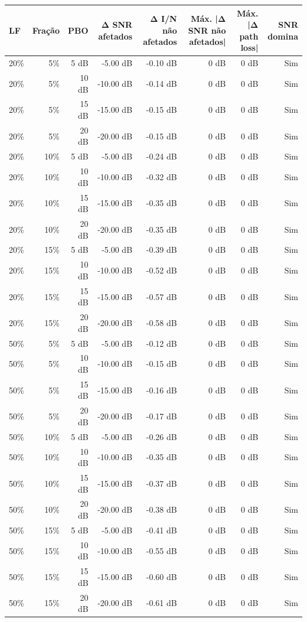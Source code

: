 \begin{tabular}{lrrrrrrr}
\toprule
LF & Fração & PBO & Δ SNR afetados & Δ I/N não afetados & Máx. |Δ SNR não afetados| & Máx. |Δ path loss| & SNR domina \\
\midrule
20\% & 5\% & 5 dB & -5.00 dB & -0.10 dB & 0 dB & 0 dB & Sim \\
20\% & 5\% & 10 dB & -10.00 dB & -0.14 dB & 0 dB & 0 dB & Sim \\
20\% & 5\% & 15 dB & -15.00 dB & -0.15 dB & 0 dB & 0 dB & Sim \\
20\% & 5\% & 20 dB & -20.00 dB & -0.15 dB & 0 dB & 0 dB & Sim \\
20\% & 10\% & 5 dB & -5.00 dB & -0.24 dB & 0 dB & 0 dB & Sim \\
20\% & 10\% & 10 dB & -10.00 dB & -0.32 dB & 0 dB & 0 dB & Sim \\
20\% & 10\% & 15 dB & -15.00 dB & -0.35 dB & 0 dB & 0 dB & Sim \\
20\% & 10\% & 20 dB & -20.00 dB & -0.35 dB & 0 dB & 0 dB & Sim \\
20\% & 15\% & 5 dB & -5.00 dB & -0.39 dB & 0 dB & 0 dB & Sim \\
20\% & 15\% & 10 dB & -10.00 dB & -0.52 dB & 0 dB & 0 dB & Sim \\
20\% & 15\% & 15 dB & -15.00 dB & -0.57 dB & 0 dB & 0 dB & Sim \\
20\% & 15\% & 20 dB & -20.00 dB & -0.58 dB & 0 dB & 0 dB & Sim \\
50\% & 5\% & 5 dB & -5.00 dB & -0.12 dB & 0 dB & 0 dB & Sim \\
50\% & 5\% & 10 dB & -10.00 dB & -0.15 dB & 0 dB & 0 dB & Sim \\
50\% & 5\% & 15 dB & -15.00 dB & -0.16 dB & 0 dB & 0 dB & Sim \\
50\% & 5\% & 20 dB & -20.00 dB & -0.17 dB & 0 dB & 0 dB & Sim \\
50\% & 10\% & 5 dB & -5.00 dB & -0.26 dB & 0 dB & 0 dB & Sim \\
50\% & 10\% & 10 dB & -10.00 dB & -0.35 dB & 0 dB & 0 dB & Sim \\
50\% & 10\% & 15 dB & -15.00 dB & -0.37 dB & 0 dB & 0 dB & Sim \\
50\% & 10\% & 20 dB & -20.00 dB & -0.38 dB & 0 dB & 0 dB & Sim \\
50\% & 15\% & 5 dB & -5.00 dB & -0.41 dB & 0 dB & 0 dB & Sim \\
50\% & 15\% & 10 dB & -10.00 dB & -0.55 dB & 0 dB & 0 dB & Sim \\
50\% & 15\% & 15 dB & -15.00 dB & -0.60 dB & 0 dB & 0 dB & Sim \\
50\% & 15\% & 20 dB & -20.00 dB & -0.61 dB & 0 dB & 0 dB & Sim \\
\bottomrule
\end{tabular}
